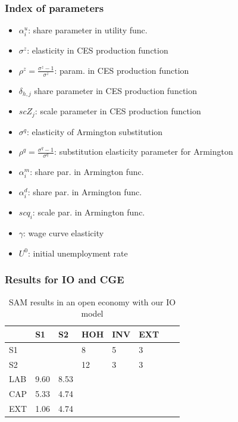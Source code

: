 \subsubsection{Index of parameters}
\begin{itemize}
	\item $\alpha^u_i$: share parameter in utility func.
	\item $\sigma^z$: elasticity in CES production function
	\item $\rho^z = \frac{\sigma^z - 1}{\sigma^z}$: param. in CES production function
	\item $\delta_{h,j}$ share parameter in CES production function
	\item $scZ_j$: scale parameter in CES production function  
	\item $\sigma^q$: elasticity of Armington substitution
	\item $\rho^q = \frac{\sigma^q-1}{\sigma^q}$: substitution elasticity parameter for Armington
	\item $\alpha^m_i$: share par. in Armington func.
	\item $\alpha^d_i$: share par. in Armington func.
	\item $scq_i$: scale par. in Armington func.
	\item $\gamma$: wage curve elasticity
	\item $U^0$: initial unemployment rate
\end{itemize}


\subsubsection{Results for IO and CGE}
\label{subsec:open_economy_results}

\begin{table}[!ht]
	\centering
	\caption{SAM results in an open economy with our IO model}
	\label{tab:SAM_IO_openEconomy}
	\begin{tabular}{llllllll}
		\toprule
		& S1 & S2 &  HOH & INV & EXT \\
		\midrule
		S1 &  &   & 8 & 5 & 3 \\
		S2 &  &    & 12 & 3 & 3 \\
		LAB & 9.60 & 8.53 &   &  &  \\
		CAP & 5.33 & 4.74 &   &  &  \\
		EXT & 1.06 & 4.74 &   &  &  \\
		\bottomrule
	\end{tabular}
\end{table}


